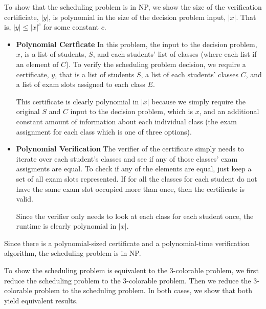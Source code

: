 \documentclass[12pt,twoside]{article}
\begin{document}
\begin{problems}

\problem  %

\begin{problemparts}

\problempart  %

To show that the scheduling problem is in NP, we show the size of the
verification certificiate, $|y|$, is polynomial in the size of the decision
problem input, $|x|$. That is, $|y| \leq |x|^c$ for some constant $c$.

\begin{itemize}

  \item {\bf Polynomial Certficate} In this problem, the input to the
  decision problem, $x$, is a list of students, $S$, and each students' list
  of classes (where each list if an element of $C$). To verify the scheduling
  problem decision, we require a certificate, $y$, that is a list of students
  $S$, a list of each students' classes $C$, and a list of exam slots
  assigned to each class $E$.

  This certificate is clearly polynomial in $|x|$ because we simply require
  the original $S$ and $C$ input to the decision problem, which is $x$, and
  an additional constant amount of information about each individual class
  (the exam assignment for each class which is one of three options).

  \item {\bf Polynomial Verification} The verifier of the certificate simply
  needs to iterate over each student's classes and see if any of those
  classes' exam assigments are equal. To check if any of the elements are
  equal, just keep a set of all exam slots represented. If for all the
  classes for each student do not have the same exam slot occupied more than
  once, then the certificate is valid. 

  Since the verifier only needs to look at each class for each student once,
  the runtime is clearly polynomial in $|x|$.

\end{itemize}

Since there is a polynomial-sized certificate and a polynomial-time
verification algorithm, the scheduling problem is in NP.

\problempart  %

To show the scheduling problem is equivalent to the 3-colorable problem,
we first reduce the scheduling problem to the 3-colorable problem. Then we
reduce the 3-colorable problem to the scheduling problem. In both cases, we
show that both yield equivalent results.


\end{problemparts}
\end{problems}
\end{document}
